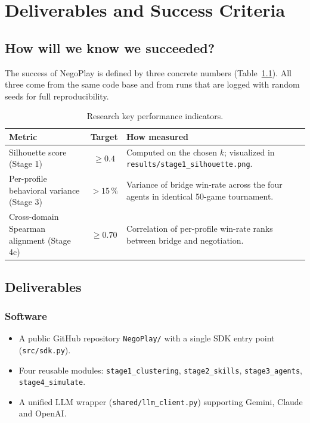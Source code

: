 \documentclass[11pt, a4paper, oneside, openany]{report}
\begin{document}
\chapter{Deliverables and Success Criteria}
\label{ch:deliv}

\section{How will we know we succeeded?}

The success of NegoPlay is defined by three concrete numbers (Table~\ref{tab:kpi}). All three come from the same code base and from runs that are logged with random seeds for full reproducibility.

\begin{table}[H]
\centering\small
\caption{Research key performance indicators.}
\label{tab:kpi}
\begin{tabularx}{\textwidth}{l c X}
\toprule
\textbf{Metric} & \textbf{Target} & \textbf{How measured} \\
\midrule
Silhouette score (Stage 1) & $\geq 0.4$ & Computed on the chosen $k$; visualized in \texttt{results/stage1\_silhouette.png}. \\
Per-profile behavioral variance (Stage 3) & $> 15\,\%$ & Variance of bridge win-rate across the four agents in identical 50-game tournament. \\
Cross-domain Spearman alignment (Stage 4c) & $\geq 0.70$ & Correlation of per-profile win-rate ranks between bridge and negotiation. \\
\bottomrule
\end{tabularx}
\end{table}

\section{Deliverables}

\subsection*{Software}
\begin{itemize}[leftmargin=*]
    \item A public GitHub repository \texttt{NegoPlay/} with a single SDK entry point (\texttt{src/sdk.py}).
    \item Four reusable modules: \texttt{stage1\_clustering}, \texttt{stage2\_skills}, \texttt{stage3\_agents}, \texttt{stage4\_simulate}.
    \item A unified LLM wrapper (\texttt{shared/llm\_client.py}) supporting Gemini, Claude and OpenAI.
\end{itemize}
\end{document}
